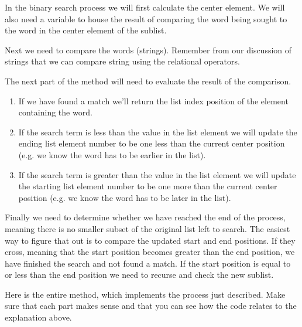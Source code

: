 In the binary search process we will first calculate the center element. We will also need a variable to house the result of comparing the word being sought to the word in the center element of the sublist.

Next we need to compare the words (strings). Remember from our discussion of strings that we can compare string using the relational operators.

The next part of the method will need to evaluate the result of the comparison.

\begin{enumerate}
	\item If we have found a match we'll return the list index position of the element containing the word. 
	\item If the search term is less than the value in the list element we will update the ending list element number to be one less than the current center position (e.g. we know the word has to be earlier in the list).
	\item If the search term is greater than the value in the list element we will update the starting list element number to be one more than the current center position (e.g. we know the word has to be later in the list).
\end{enumerate}

Finally we need to determine whether we have reached the end of the process, meaning there is no smaller subset of the original list left to search. The easiest way to figure that out is to compare the updated start and end positions. If they cross, meaning that the start position becomes greater than the end position, we have finished the search and not found a match. If the start position is equal to or less than the end position we need to recurse and check the new sublist.

Here is the entire method, which implements the process just described. Make sure that each part makes sense and that you can see how the code relates to the explanation above.

